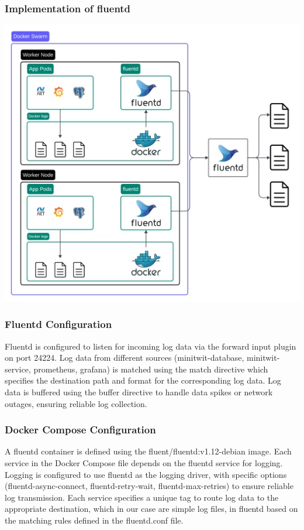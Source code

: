 \subsubsection{Implementation of fluentd}
\begin{center}
    \includegraphics[width=1\textwidth]{Logging2.png}
\end{center}
\subsubsection*{Fluentd Configuration}
Fluentd is configured to listen for incoming log data via the forward input plugin on port 24224. Log data from different sources 
(minitwit-database, minitwit-service, prometheus, grafana) is matched using the match directive which specifies the destination path and format for the corresponding log data. 
Log data is buffered using the buffer directive to handle data spikes or network outages, ensuring reliable log collection.

\subsubsection*{Docker Compose Configuration}
A fluentd container is defined using the fluent/fluentd:v1.12-debian image. Each service in the Docker Compose file depends on the fluentd service for logging. 
Logging is configured to use fluentd as the logging driver, with specific options (fluentd-async-connect, fluentd-retry-wait, fluentd-max-retries) to ensure reliable log transmission. 
Each service specifies a unique tag to route log data to the appropriate destination, which in our case are simple log files, in fluentd based on the matching 
rules defined in the fluentd.conf file.